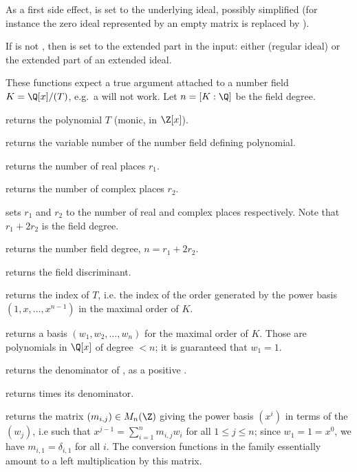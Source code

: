 As a first side effect,  is set to the underlying ideal,
possibly simplified (for instance the zero ideal represented by an empty
matrix is replaced by ).

If  is not , then  is set to the
extended part in the input: either  (regular ideal)
or the extended part of an extended ideal.


These functions expect a true  argument attached to a number field
$K = \Q[x]/(T)$, e.g.~a  will not work. Let $n = [K:\Q]$ be the
field degree.

 returns the polynomial $T$ (monic, in $\Z[x]$).

 returns the variable number of the number
field defining polynomial.

 returns the number of real places $r_1$.

 returns the number of complex places $r_2$.

 sets $r_1$ and $r_2$
to the number of real and complex places respectively. Note that
$r_1+2r_2$ is the field degree.

 returns the number field degree, $n = r_1 +
2r_2$.

 returns the field discriminant.

 returns the index of $T$, i.e. the index of
the order generated by the power basis $(1,x,\ldots,x^{n-1})$ in the
maximal order of $K$.

 returns a basis $(w_1,w_2,\ldots,w_n)$ for the
maximal order of $K$. Those are polynomials in $\Q[x]$ of degree $<n$; it is
guaranteed that $w_1 = 1$.

 returns the denominator of ,
as a positive .

 returns  times its
denominator.

 returns the matrix $(m_{i,j})\in M_n(\Z)$
giving the power basis $(x^i)$ in terms of the $(w_j)$, i.e such that
$x^{j-1} = \sum_{i = 1}^n m_{i,j} w_i$ for all $1\leq j \leq n$; since $w_1 =
1 = x^0$, we have $m_{i,1} = \delta_{i,1}$ for all $i$. The conversion
functions in the  family essentially amount to a left
multiplication by this matrix.

